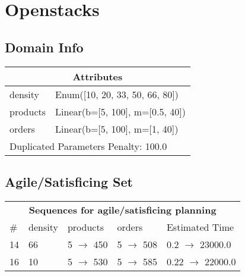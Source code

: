 \documentclass{article}
\begin{document}
                            \newpage \section{Openstacks}
                    \subsection*{Domain Info}

                    \begin{center}
                    \begin{tabular}{p{}p{}}
                    \multicolumn{2}{c}{\bf \large Attributes}\\\midrule
                    density & Enum([10, 20, 33, 50, 66, 80])\\
products & Linear(b=[5, 100], m=[0.5, 40])\\
orders & Linear(b=[5, 100], m=[1, 40])
                    
                     \\\midrule
                    \multicolumn{2}{l}{Duplicated Parameters Penalty: 100.0}
                    \end{tabular}
                    \end{center}
                
                         \subsection*{Agile/Satisficing Set}

                        \begin{center}
                        \begin{tabular}{l|l|l|l|l}
                        \multicolumn{5}{c}{\bf \large Sequences for agile/satisficing planning}\\
                        \# & density & products & orders & Estimated Time\\\midrule
                        14&66&5 $\rightarrow$ 450&5 $\rightarrow$ 508&0.2 $\rightarrow$ 23000.0\\
16&10&5 $\rightarrow$ 530&5 $\rightarrow$ 585&0.22 $\rightarrow$ 22000.0
                        \end{tabular}
                        \end{center}
                    
\end{document}
